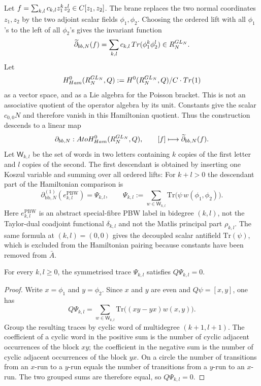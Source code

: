 \documentclass[11pt]{memoir}
\begin{document}
\begin{constr}\label{constr:boundary-evaluation}
  Let $f=\sum_{k,l}c_{k,l}z_1^kz_2^l\in C[z_1,z_2]$. The brane replaces the
  two normal coordinates $z_1,z_2$ by the two adjoint scalar fields
  $\phi_1,\phi_2$. Choosing the ordered lift with all $\phi_1$'s to the left
  of all $\phi_2$'s gives the invariant function
  $$\widetilde\partial_{bb,N}(f)
    =\sum_{k,l}c_{k,l}\,Tr(\phi_1^k\phi_2^l)
    \in R_N^{GL_N}.$$
  Let
  $$H^0_{Ham}(R_N^{GL_N},Q)
    :=H^0(R_N^{GL_N},Q)/C\cdot Tr(1)$$
  as a vector space, and as a Lie algebra for the Poisson bracket. This is not
  an associative quotient of the operator algebra by its unit. Constants give
  the scalar $c_{0,0}N$ and therefore vanish in this Hamiltonian quotient.
  Thus the construction descends to a linear map
  $$\partial_{bb,N}:Ato
    H^0_{Ham}(R_N^{GL_N},Q),\qquad
    [f]\longmapsto \widetilde\partial_{bb,N}(f).$$
  Let $\mathsf W_{k,l}$ be the set of words in two letters containing $k$
  copies of the first letter and $l$ copies of the second. The first descendant
  is obtained by inserting one Koszul variable and summing over all ordered
  lifts:
  For $k+l>0$ the descendant part of the Hamiltonian comparison is
  $$\partial_{\mathrm{bb},N}^{(1)}(e^{\mathrm{PBW}}_{k,l})=\Psi_{k,l},\qquad
    \Psi_{k,l}:=\sum_{w\in\mathsf W_{k,l}}
      \mathrm{Tr}\bigl(\psi\,w(\phi_1,\phi_2)\bigr).$$
  Here $e^{\mathrm{PBW}}_{k,l}$ is an abstract special-fibre PBW label in
  bidegree $(k,l)$, not the Taylor-dual coadjoint functional
  $\delta_{k,l}$ and not the Matlis principal part $\rho_{k,l}$.
  The same formula at $(k,l)=(0,0)$ gives the decoupled scalar antifield
  $\mathrm{Tr}(\psi)$, which is excluded from the Hamiltonian pairing because
  constants have been removed from $\bar A$.
\end{constr}

\begin{lem}\label{lem:first-descendant-cycles}
  For every $k,l\geq0$, the symmetrised trace $\Psi_{k,l}$ satisfies
  $Q\Psi_{k,l}=0$.
\end{lem}

\begin{proof}
  Write $x=\phi_1$ and $y=\phi_2$. Since $x$ and $y$ are even and
  $Q\psi=[x,y]$, one has
  $$Q\Psi_{k,l}
    =\sum_{w\in\mathsf W_{k,l}}\mathrm{Tr}\bigl((xy-yx)w(x,y)\bigr).$$
  Group the resulting traces by cyclic word of multidegree $(k+1,l+1)$. The
  coefficient of a cyclic word in the positive sum is the number of cyclic
  adjacent occurrences of the block $xy$; the coefficient in the negative sum
  is the number of cyclic adjacent occurrences of the block $yx$. On a circle
  the number of transitions from an $x$-run to a $y$-run equals the number of
  transitions from a $y$-run to an $x$-run. The two grouped sums are therefore
  equal, so $Q\Psi_{k,l}=0$.
\end{proof}
\end{document}
